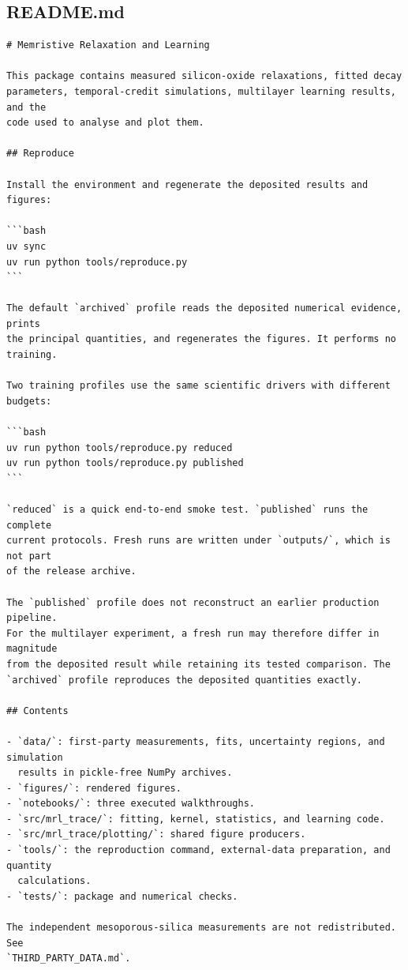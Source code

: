 \documentclass[a4paper,10pt]{article}
\begin{document}
\subsection{README.md}
\begin{Verbatim}
# Memristive Relaxation and Learning

This package contains measured silicon-oxide relaxations, fitted decay
parameters, temporal-credit simulations, multilayer learning results, and the
code used to analyse and plot them.

## Reproduce

Install the environment and regenerate the deposited results and figures:

```bash
uv sync
uv run python tools/reproduce.py
```

The default `archived` profile reads the deposited numerical evidence, prints
the principal quantities, and regenerates the figures. It performs no training.

Two training profiles use the same scientific drivers with different budgets:

```bash
uv run python tools/reproduce.py reduced
uv run python tools/reproduce.py published
```

`reduced` is a quick end-to-end smoke test. `published` runs the complete
current protocols. Fresh runs are written under `outputs/`, which is not part
of the release archive.

The `published` profile does not reconstruct an earlier production pipeline.
For the multilayer experiment, a fresh run may therefore differ in magnitude
from the deposited result while retaining its tested comparison. The
`archived` profile reproduces the deposited quantities exactly.

## Contents

- `data/`: first-party measurements, fits, uncertainty regions, and simulation
  results in pickle-free NumPy archives.
- `figures/`: rendered figures.
- `notebooks/`: three executed walkthroughs.
- `src/mrl_trace/`: fitting, kernel, statistics, and learning code.
- `src/mrl_trace/plotting/`: shared figure producers.
- `tools/`: the reproduction command, external-data preparation, and quantity
  calculations.
- `tests/`: package and numerical checks.

The independent mesoporous-silica measurements are not redistributed. See
`THIRD_PARTY_DATA.md`.
\end{Verbatim}
\end{document}
